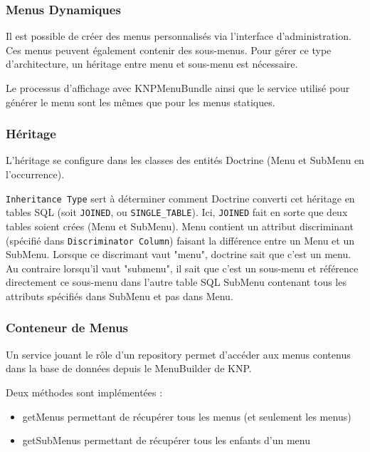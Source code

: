\documentclass[a4paper,12pt, notitlepage]{report}
\begin{document}
\subsubsection{Menus Dynamiques}
Il est possible de créer des menus personnalisés via l'interface d'administration. Ces menus peuvent également contenir des sous-menus.
Pour gérer ce type d'architecture, un héritage entre menu et sous-menu est nécessaire. 

Le processus d'affichage avec KNPMenuBundle ainsi que le \gls{service} utilisé pour générer le menu sont les mêmes que pour les menus statiques.
\subsubsection{Héritage}
L'héritage se configure dans les classes des entités Doctrine (Menu et SubMenu en l'occurrence).


\verb?Inheritance Type? sert à déterminer comment Doctrine converti cet héritage en tables SQL (soit \verb?JOINED?, ou \verb?SINGLE_TABLE?). Ici, \verb?JOINED? fait en sorte que deux tables soient crées (Menu et SubMenu). Menu contient un attribut discriminant (spécifié dans \verb?Discriminator Column?) faisant la différence entre un Menu et un SubMenu. Lorsque ce discrimant vaut "menu", doctrine sait que c'est un menu. Au contraire lorsqu'il vaut "submenu", il sait que c'est un sous-menu et référence directement ce sous-menu dans l'autre table SQL SubMenu contenant tous les attributs spécifiés dans SubMenu et pas dans Menu.
\subsubsection{Conteneur de Menus}
Un \gls{service} jouant le rôle d'un \gls{repository} permet d'accéder aux menus contenus dans la base de données depuis le MenuBuilder de KNP. 

Deux méthodes sont implémentées :
\begin{itemize}
    \item getMenus permettant de récupérer tous les menus (et seulement les menus)
    \item getSubMenus permettant de récupérer tous les enfants d'un menu
\end{itemize}

\end{document}
